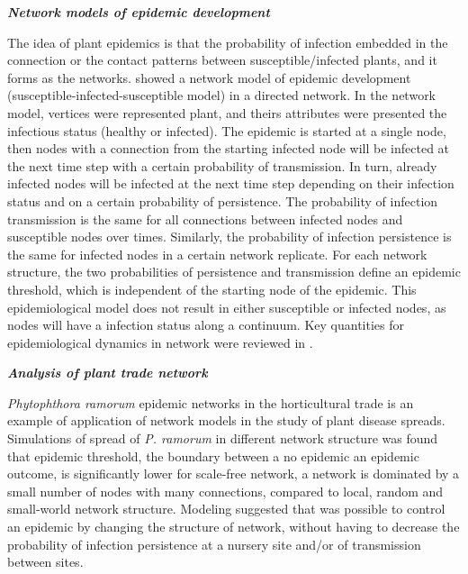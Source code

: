\textit{\textbf{Network models of epidemic development}}

The idea of plant epidemics is that the probability of infection embedded in the connection or the contact patterns between susceptible/infected plants, and it forms as the networks.
 showed a network model of epidemic development (susceptible-infected-susceptible model) in a directed network. In the network model, vertices were represented plant, and theirs attributes were presented the infectious status (healthy or infected). The epidemic is started at a single node, then nodes with a connection from the starting infected node will be infected at the next time step with a certain probability of transmission. In turn, already infected nodes will be infected at the next time step depending on their infection status and on a certain probability of persistence. The probability of infection transmission is the same for all connections between infected nodes and susceptible nodes over times. Similarly, the probability of infection persistence is the same for infected nodes in a certain network replicate. For each network structure, the two probabilities of persistence and transmission define an epidemic threshold, which is independent of the starting node of the epidemic. This epidemiological model does not result in either susceptible or infected nodes, as nodes will have a infection status along a continuum. Key quantities for epidemiological dynamics in network were reviewed in .

\textit{\textbf{Analysis of plant trade network}}

\textit{Phytophthora ramorum} epidemic networks in the horticultural trade is an example of application of network models in the study of plant disease spreads. Simulations of spread of \textit{P. ramorum} in different network structure was found that epidemic threshold, the boundary between a no epidemic an epidemic outcome, is significantly lower for scale-free network, a network is dominated by a small number of nodes with many connections, compared to local, random and small-world network structure. Modeling suggested that was possible to control an epidemic by changing the structure of network, without having to decrease the probability of infection persistence at a nursery site and/or of transmission between sites.

